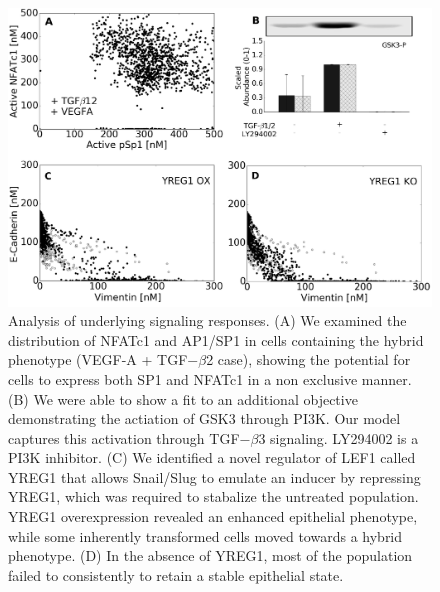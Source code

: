 \documentclass[12pt]{article}
\begin{document}
\clearpage

\begin{figure}
\includegraphics [width=1.0\linewidth] {./figs/Fig4_mechanism.pdf}
\caption{Analysis of underlying signaling responses.
(A) We examined the distribution of NFATc1 and AP1/SP1 in cells containing the hybrid phenotype (VEGF-A + TGF$-\beta$2 case), showing the potential for cells to express both SP1 and NFATc1 in a non exclusive manner.
(B) We were able to show a fit to an additional objective demonstrating the actiation of GSK3 through PI3K. Our model captures this activation through TGF$-\beta$3 signaling. LY294002 is a PI3K inhibitor.
(C) We identified a novel regulator of LEF1 called YREG1 that allows Snail/Slug to emulate an inducer by repressing YREG1, which was required to stabalize the untreated population.
YREG1 overexpression revealed an enhanced epithelial phenotype, while some inherently transformed cells moved towards a hybrid phenotype.
(D) In the absence of YREG1, most of the population failed to consistently to retain a stable epithelial state.}\label{fg:F4}
\end{figure}

\clearpage
\end{document}
